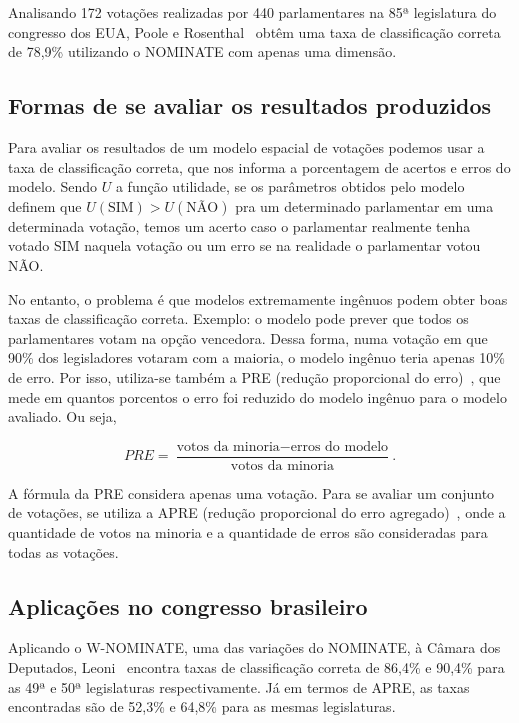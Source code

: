 \documentclass[a4paper, 12pt]{article}
\newcommand\nay{NÃO\xspace}
\newcommand\yea{SIM\xspace}
\newcommand\nominate{NOMINATE\xspace}
\newcommand\wnominate{W-NOMINATE\xspace}
\begin{document}
Analisando 172 votações realizadas por 440 parlamentares na 85ª legislatura do congresso dos EUA, Poole e Rosenthal~\cite{poole1985nominate} obtêm uma taxa de classificação correta de 78,9\% utilizando o \nominate com apenas uma dimensão.

\subsection{Formas de se avaliar os resultados produzidos}

Para avaliar os resultados de um modelo espacial de votações podemos usar a taxa de classificação correta, que nos informa a porcentagem de acertos e erros do modelo. Sendo $U$ a função utilidade, se os parâmetros obtidos pelo modelo definem que $U(\textrm{SIM}) > U(\textrm{NÃO})$ pra um determinado parlamentar em uma determinada votação, temos um acerto caso o parlamentar realmente tenha votado \yea naquela votação ou um erro se na realidade o parlamentar votou \nay.

No entanto, o problema é que modelos extremamente ingênuos podem obter boas taxas de classificação correta. Exemplo: o modelo pode prever que todos os parlamentares votam na opção vencedora. Dessa forma, numa votação em que 90\% dos legisladores votaram com a maioria, o modelo ingênuo teria apenas 10\% de erro. Por isso, utiliza-se também a PRE (redução proporcional do erro)~\cite{leoni02cdep}, que mede em quantos porcentos o erro foi reduzido do modelo ingênuo para o modelo avaliado. Ou seja,

\[PRE = \frac{\textrm{votos da minoria} - \textrm{erros do modelo}}{\textrm{votos da minoria}}.\]

A fórmula da PRE considera apenas uma votação. Para se avaliar um conjunto de votações, se utiliza a APRE (redução proporcional do erro agregado)~\cite{leoni02cdep}, onde a quantidade de votos na minoria e a quantidade de erros são consideradas para todas as votações.

\subsection{Aplicações no congresso brasileiro}

Aplicando o \wnominate, uma das variações do \nominate, à Câmara dos Deputados, Leoni~\cite{leoni02cdep} encontra taxas de classificação correta de 86,4\% e 90,4\% para as 49ª e 50ª legislaturas respectivamente. Já em termos de APRE, as taxas encontradas são de 52,3\% e 64,8\% para as mesmas legislaturas.
\end{document}

